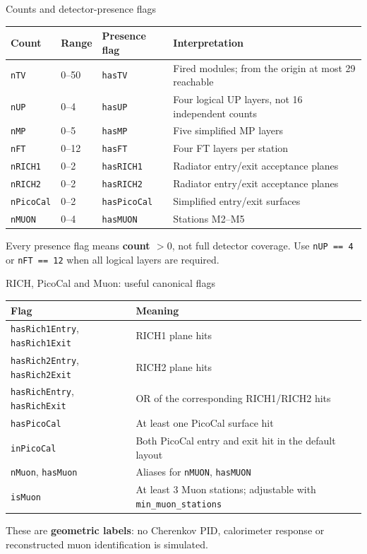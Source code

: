 \documentclass[aspectratio=169,11pt]{beamer}
\begin{document}
\begin{frame}{Counts and detector-presence flags}
\small
\begin{tabularx}{\textwidth}{@{}lllX@{}}
\toprule Count & Range & Presence flag & Interpretation \\
\midrule
\texttt{nTV} & 0--50 & \texttt{hasTV} & Fired modules; from the origin at most 29 reachable \\
\texttt{nUP} & 0--4 & \texttt{hasUP} & Four logical UP layers, not 16 independent counts \\
\texttt{nMP} & 0--5 & \texttt{hasMP} & Five simplified MP layers \\
\texttt{nFT} & 0--12 & \texttt{hasFT} & Four FT layers per station \\
\texttt{nRICH1} & 0--2 & \texttt{hasRICH1} & Radiator entry/exit acceptance planes \\
\texttt{nRICH2} & 0--2 & \texttt{hasRICH2} & Radiator entry/exit acceptance planes \\
\texttt{nPicoCal} & 0--2 & \texttt{hasPicoCal} & Simplified entry/exit surfaces \\
\texttt{nMUON} & 0--4 & \texttt{hasMUON} & Stations M2--M5 \\
\bottomrule
\end{tabularx}\par
\vspace{4mm}\normalsize Every presence flag means \textbf{count $>0$}, not full detector coverage.
Use \mbox{\texttt{nUP == 4}} or \mbox{\texttt{nFT == 12}} when all logical layers are required.
\end{frame}

\begin{frame}{RICH, PicoCal and Muon: useful canonical flags}
\small
\begin{tabularx}{\textwidth}{@{}lX@{}}
\toprule Flag & Meaning \\
\midrule
\texttt{hasRich1Entry}, \texttt{hasRich1Exit} & RICH1 plane hits \\
\texttt{hasRich2Entry}, \texttt{hasRich2Exit} & RICH2 plane hits \\
\texttt{hasRichEntry}, \texttt{hasRichExit} & OR of the corresponding RICH1/RICH2 hits \\
\texttt{hasPicoCal} & At least one PicoCal surface hit \\
\texttt{inPicoCal} & Both PicoCal entry and exit hit in the default layout \\
\texttt{nMuon}, \texttt{hasMuon} & Aliases for \texttt{nMUON}, \texttt{hasMUON} \\
\texttt{isMuon} & At least 3 Muon stations; adjustable with \texttt{min\_muon\_stations} \\
\bottomrule
\end{tabularx}\par
\vspace{4mm}\normalsize These are \textbf{geometric labels}: no Cherenkov PID, calorimeter response
or reconstructed muon identification is simulated.
\end{frame}
\end{document}
